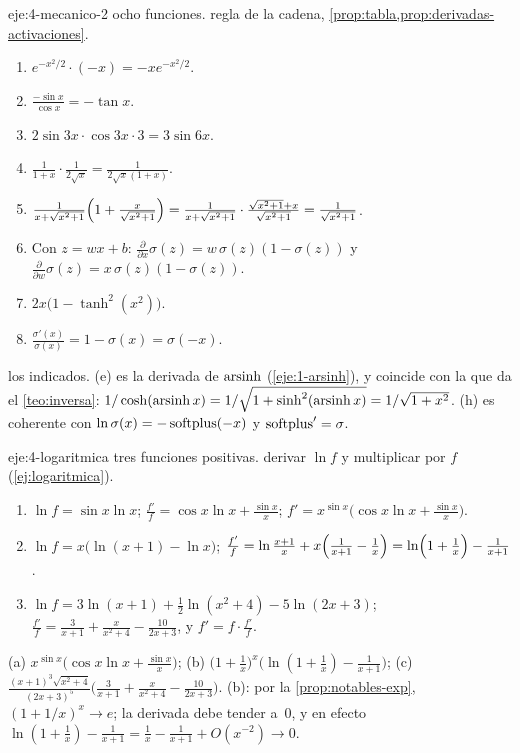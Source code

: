 \begin{solucion}{eje:4-mecanico-2}
\datos ocho funciones.
\planteamiento regla de la cadena, \cref{prop:tabla,prop:derivadas-activaciones}.
\pasos
\begin{enumerate}[label=(\alph*)]
  \item $e^{-x^{2}/2}\cdot(-x)=-xe^{-x^{2}/2}$.
  \item $\frac{-\sin x}{\cos x}=-\tan x$.
  \item $2\sin3x\cdot\cos3x\cdot3=3\sin6x$.
  \item $\frac{1}{1+x}\cdot\frac{1}{2\sqrt x}=\frac{1}{2\sqrt x(1+x)}$.
  \item $\frac{1}{x+\sqrt{x^{2}+1}}\Bigl(1+\frac{x}{\sqrt{x^{2}+1}}\Bigr)=\frac{1}{x+\sqrt{x^{2}+1}}\cdot\frac{\sqrt{x^{2}+1}+x}{\sqrt{x^{2}+1}}=\frac{1}{\sqrt{x^{2}+1}}$.
  \item Con $z=wx+b$: $\frac{\partial}{\partial x}\sigma(z)=w\,\sigma(z)(1-\sigma(z))$ y $\frac{\partial}{\partial w}\sigma(z)=x\,\sigma(z)(1-\sigma(z))$.
  \item $2x\bigl(1-\tanh^{2}(x^{2})\bigr)$.
  \item $\frac{\sigma'(x)}{\sigma(x)}=1-\sigma(x)=\sigma(-x)$.
\end{enumerate}
\resultado los indicados.
\comprobacion (e) es la derivada de $\operatorname{arsinh}$ (\cref{eje:1-arsinh}), y coincide con la que da el \cref{teo:inversa}: $1/\cosh(\operatorname{arsinh} x)=1/\sqrt{1+\sinh^{2}(\operatorname{arsinh} x)}=1/\sqrt{1+x^{2}}$. (h) es coherente con $\ln\sigma(x)=-\operatorname{softplus}(-x)$ y $\operatorname{softplus}'=\sigma$.
\end{solucion}

\begin{solucion}{eje:4-logaritmica}
\datos tres funciones positivas.
\planteamiento derivar $\ln f$ y multiplicar por $f$ (\cref{ej:logaritmica}).
\pasos
\begin{enumerate}[label=(\alph*)]
  \item $\ln f=\sin x\ln x$; $\frac{f'}{f}=\cos x\ln x+\frac{\sin x}{x}$; $f'=x^{\sin x}\bigl(\cos x\ln x+\frac{\sin x}{x}\bigr)$.
  \item $\ln f=x\bigl(\ln(x+1)-\ln x\bigr)$; $\frac{f'}{f}=\ln\frac{x+1}{x}+x\Bigl(\frac{1}{x+1}-\frac1x\Bigr)=\ln\Bigl(1+\frac1x\Bigr)-\frac{1}{x+1}$.
  \item $\ln f=3\ln(x+1)+\frac12\ln(x^{2}+4)-5\ln(2x+3)$; $\frac{f'}{f}=\frac{3}{x+1}+\frac{x}{x^{2}+4}-\frac{10}{2x+3}$, y $f'=f\cdot\frac{f'}{f}$.
\end{enumerate}
\resultado (a) $x^{\sin x}\bigl(\cos x\ln x+\frac{\sin x}{x}\bigr)$; (b) $\bigl(1+\frac1x\bigr)^{x}\bigl(\ln(1+\frac1x)-\frac{1}{x+1}\bigr)$; (c) $\frac{(x+1)^{3}\sqrt{x^{2}+4}}{(2x+3)^{5}}\bigl(\frac{3}{x+1}+\frac{x}{x^{2}+4}-\frac{10}{2x+3}\bigr)$.
\comprobacion (b): por la \cref{prop:notables-exp}, $(1+1/x)^{x}\to e$; la derivada debe tender a~0, y en efecto $\ln(1+\frac1x)-\frac{1}{x+1}=\frac1x-\frac{1}{x+1}+O(x^{-2})\to0$.
\end{solucion}


